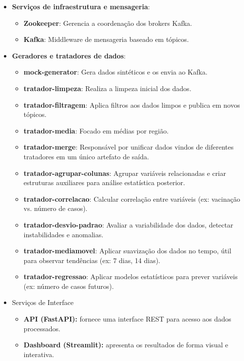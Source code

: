 \documentclass[a4paper,12pt]{article}
\begin{document}
\begin{itemize}
  \item \textbf{Serviços de infraestrutura e mensageria}: 
          \begin{itemize}
          \item \textbf{Zookeeper}: Gerencia a coordenação dos brokers Kafka.
          \item \textbf{Kafka}: Middleware de mensageria baseado em tópicos.
          \end{itemize}
  \item \textbf{Geradores e tratadores de dados}:
  \begin{itemize}
  \item \textbf{mock-generator}: Gera dados sintéticos e os envia ao Kafka.
  \item \textbf{tratador-limpeza}: Realiza a limpeza inicial dos dados.
  \item \textbf{tratador-filtragem}: Aplica filtros aos dados limpos e publica em novos tópicos.
  \item \textbf{tratador-media}: Focado em médias por região.
  \item \textbf{tratador-merge}: Responsável por unificar dados vindos de diferentes tratadores em um único artefato de saída.
    \item \textbf{tratador-agrupar-colunas}: Agrupar variáveis relacionadas e criar estruturas auxiliares para análise estatística posterior.
    \item \textbf{tratador-correlacao}: Calcular correlação entre variáveis (ex: vacinação vs. número de casos).
    \item \textbf{tratador-desvio-padrao}: Avaliar a variabilidade dos dados, detectar instabilidades e anomalias.
    \item \textbf{tratador-mediamovel}: Aplicar suavização dos dados no tempo, útil para observar tendências (ex: 7 dias, 14 dias).
    \item \textbf{tratador-regressao}: Aplicar modelos estatísticos para prever variáveis (ex: número de casos futuros).
\end{itemize}
    \item Serviços de Interface 

    \begin{itemize}
  \item \textbf{API (FastAPI):} fornece uma interface REST para acesso aos dados processados.
  \item \textbf{Dashboard (Streamlit):} apresenta os resultados de forma visual e interativa.
\end{itemize}
\end{itemize}
\end{document}

